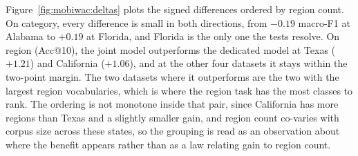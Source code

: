 Figure~\ref{fig:mobiwac:deltas} plots the signed differences ordered by region count. On
category, every difference is small in both directions, from $-0.19$ macro-F1 at Alabama to
$+0.19$ at Florida, and Florida is the only one the tests resolve.
On region (Acc@10), the joint model outperforms the dedicated model at Texas ($+1.21$) and
California ($+1.06$), and at the other four datasets it stays within the two-point margin. The two
datasets where it outperforms are the two with the largest region vocabularies, which is where the
region task has the most classes to rank.
The ordering is not monotone inside that pair, since California has more regions than Texas and a
slightly smaller gain, and region count co-varies with corpus size across these states, so the
grouping is read as an observation about where the benefit appears rather than as a law relating
gain to region count.

